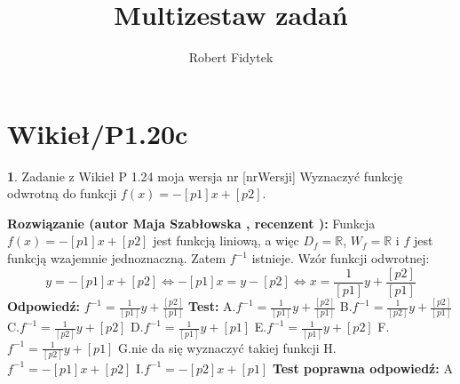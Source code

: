 \documentclass[12pt, a4paper]{article}
\title{Multizestaw zadań}
\author{Robert Fidytek}
\date{}
\theoremstyle{definition} %
\newtheorem{zad}{}
\newcommand{\kategoria}[1]{\section{#1}} %
\newcommand{\zadStart}[1]{\begin{zad}#1\newline} %
\newcommand{\zadStop}{\end{zad}}   %
\newcommand{\rozwStart}[2]{\noindent \textbf{Rozwiązanie (autor #1 , recenzent #2): }\newline} %
\newcommand{\rozwStop}{\newline}                                            %
\newcommand{\odpStart}{\noindent \textbf{Odpowiedź:}\newline}    %
\newcommand{\odpStop}{\newline}                                             %
\newcommand{\testStart}{\noindent \textbf{Test:}\newline} %
\newcommand{\testStop}{\newline} %
\newcommand{\kluczStart}{\noindent \textbf{Test poprawna odpowiedź:}\newline} %
\newcommand{\kluczStop}{\newline} %
\begin{document}
\maketitle


\kategoria{Wikieł/P1.20c}
\zadStart{Zadanie z Wikieł P 1.24  moja wersja nr [nrWersji]}
Wyznaczyć funkcję odwrotną do funkcji $f(x)=-[p1]x+[p2]$.
\zadStop
\rozwStart{Maja Szabłowska}{}
Funkcja $f(x)=-[p1]x+[p2]$ jest funkcją liniową, a więc $D_{f}=\mathbb{R}$, $W_{f}=\mathbb{R}$ i $f$ jest funkcją wzajemnie jednoznaczną. Zatem $f^{-1}$ istnieje. Wzór funkcji odwrotnej:
$$y=-[p1]x+[p2] \Leftrightarrow  -[p1]x=y-[p2] \Leftrightarrow 
x=\frac{1}{[p1]}y+\frac{[p2]}{[p1]}$$
\rozwStop
\odpStart
$f^{-1}=\frac{1}{[p1]}y+\frac{[p2]}{[p1]}$
\odpStop
\testStart
A.$f^{-1}=\frac{1}{[p1]}y+\frac{[p2]}{[p1]}$
B.$f^{-1}=\frac{1}{[p2]}y+\frac{[p2]}{[p1]}$
C.$f^{-1}=\frac{1}{[p2]}y+[p2]$
D.$f^{-1}=\frac{1}{[p1]}y+[p1]$
E.$f^{-1}=\frac{1}{[p1]}y+[p2]$
F.$f^{-1}=\frac{1}{[p2]}y+[p1]$
G.nie da się wyznaczyć takiej funkcji
H.$f^{-1}=-[p1]x+[p2]$
I.$f^{-1}=-[p2]x+[p1]$
\testStop
\kluczStart
A
\kluczStop
\end{document}
